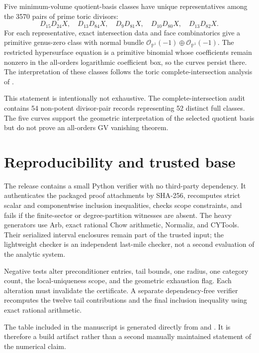 \documentclass[11pt]{article}
\begin{document}
Five minimum-volume quotient-basis classes have unique representatives among
the 3570 pairs of prime toric divisors:
\begin{equation}
 D_{15}D_{24}X,\quad D_{13}D_{84}X,\quad D_9D_{81}X,\quad
 D_{10}D_{80}X,\quad D_{13}D_{82}X.
\end{equation}
For each representative, exact intersection data and face combinatorics give
a primitive genus-zero class with normal bundle
$\mathcal O_{\mathbb P^1}(-1)\oplus\mathcal O_{\mathbb P^1}(-1)$.  The
restricted hypersurface equation is a primitive binomial whose coefficients
remain nonzero in the all-orders logarithmic coefficient box, so the curves
persist there. The interpretation of these classes follows the toric
complete-intersection analysis of \cite{Demirtas2024}.

This statement is intentionally not exhaustive.  The complete-intersection
audit contains 54 non-potent divisor-pair records representing 52 distinct
full classes.  The five curves support the geometric interpretation of the
selected quotient basis but do not prove an all-orders GV vanishing theorem.

\section{Reproducibility and trusted base}

The release contains a small Python verifier with no third-party dependency.
It authenticates the packaged proof attachments by SHA-256, recomputes strict
scalar and componentwise inclusion inequalities, checks scope constraints,
and fails if the finite-sector or degree-partition witnesses are absent.  The
heavy generators use Arb, exact rational Chow arithmetic, Normaliz, and
CYTools.  Their serialized interval enclosures remain part of the trusted
input; the lightweight checker is an independent last-mile checker, not a
second evaluation of the analytic system.

Negative tests alter preconditioner entries, tail bounds, one radius, one
category count, the local-uniqueness scope, and the geometric exhaustion
flag.  Each alteration must invalidate the certificate.  A separate
dependency-free verifier recomputes the twelve tail contributions and the
final inclusion inequality using exact rational arithmetic.

The table included in the manuscript is generated directly from
 and
. It is therefore a build
artifact rather than a second manually maintained statement of the numerical
claim.
\end{document}
